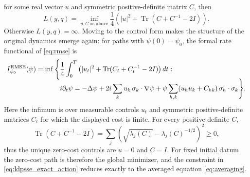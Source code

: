 \documentclass[a4paper,10pt]{amsart}
\DeclareMathOperator{\trace}{Tr}
\theoremstyle{remark}
\numberwithin{equation}{section}
\begin{document}
for some real vector $u$ and symmetric positive-definite matrix $C$,
then
\begin{equation*}
    L(y,q)
    =\inf_{u,C\text{ as above}}
      \frac14\left(
        |u|^2+\trace(C+C^{-1}-2I)
      \right).
\end{equation*}
Otherwise $L(y,q)=\infty$. Moving to the control form makes the structure of the original dynamics emerge again: for paths with $\psi(0)=\psi_0$, the formal rate functional of \eqref{eq:rmse} is
\begin{align}\label{eq:ldpsse_exact_action}
    I^{\mathrm{RMSE}}_{\psi_0}(\psi)
    =\inf\Bigg\{&\frac14\int_0^T
       \left(|u_t|^2+\trace(C_t+C_t^{-1}-2I)\right)dt:\notag\\[-2mm]
       &i\partial_t\psi
       =-\Delta\psi
        +2i\sum_k u_k\,\sigma_k\cdot\nabla\psi
       +\psi\sum_{h,k}(u_hu_k+C_{hk})\,\sigma_h\cdot\sigma_k
    \Bigg\}.
\end{align}
Here the infimum is over measurable controls $u_t$ and symmetric positive-definite matrices $C_t$ for which the displayed cost is finite. For every positive-definite $C$,
\begin{equation*}
    \trace(C+C^{-1}-2I)
    =\sum_j\left(\sqrt{\lambda_j(C)}-\lambda_j(C)^{-1/2}\right)^2\geq0,
\end{equation*}
thus the unique zero-cost controls are $u=0$ and $C=I$. For fixed initial datum the zero-cost path is therefore the global minimizer, and the constraint in \eqref{eq:ldpsse_exact_action} reduces exactly to the averaged equation \eqref{eq:averaging}.
\end{document}
